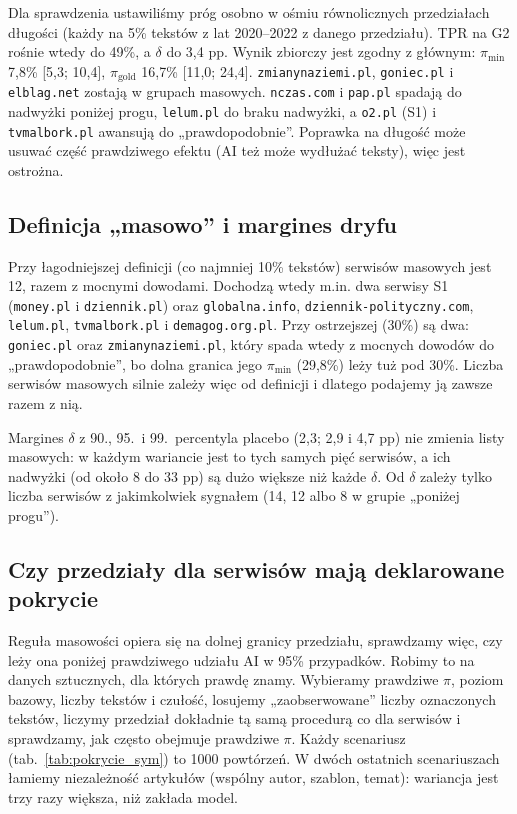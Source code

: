 \documentclass[11pt,a4paper]{article}
\newcommand{\pimin}{\ensuremath{\pi_{\mathrm{min}}}}
\newcommand{\pigold}{\ensuremath{\pi_{\mathrm{gold}}}}
\newcommand{\dom}[1]{\texttt{#1}}
\begin{document}
Dla sprawdzenia ustawiliśmy próg osobno w ośmiu równolicznych przedziałach długości (każdy na 5\% tekstów z lat 2020--2022 z danego przedziału). TPR na G2 rośnie wtedy do 49\%, a $\delta$ do 3,4 pp. Wynik zbiorczy jest zgodny z głównym: \pimin{} 7,8\% [5,3; 10,4], \pigold{} 16,7\% [11,0; 24,4]. \dom{zmianynaziemi.pl}, \dom{goniec.pl} i \dom{elblag.net} zostają w grupach masowych. \dom{nczas.com} i \dom{pap.pl} spadają do nadwyżki poniżej progu, \dom{lelum.pl} do braku nadwyżki, a \dom{o2.pl} (S1) i \dom{tvmalbork.pl} awansują do „prawdopodobnie”. Poprawka na długość może usuwać część prawdziwego efektu (AI też może wydłużać teksty), więc jest ostrożna.

\subsection{Definicja „masowo” i margines dryfu}

Przy łagodniejszej definicji (co najmniej 10\% tekstów) serwisów masowych jest 12, razem z mocnymi dowodami. Dochodzą wtedy m.in. dwa serwisy S1 (\dom{money.pl} i \dom{dziennik.pl}) oraz \dom{globalna.info}, \dom{dziennik-polityczny.com}, \dom{lelum.pl}, \dom{tvmalbork.pl} i \dom{demagog.org.pl}. Przy ostrzejszej (30\%) są dwa: \dom{goniec.pl} oraz \dom{zmianynaziemi.pl}, który spada wtedy z mocnych dowodów do „prawdopodobnie”, bo dolna granica jego \pimin{} (29,8\%) leży tuż pod 30\%. Liczba serwisów masowych silnie zależy więc od definicji i dlatego podajemy ją zawsze razem z nią.

Margines $\delta$ z 90., 95.\ i 99.\ percentyla placebo (2,3; 2,9 i 4,7 pp) nie zmienia listy masowych: w każdym wariancie jest to tych samych pięć serwisów, a ich nadwyżki (od około 8 do 33 pp) są dużo większe niż każde $\delta$. Od $\delta$ zależy tylko liczba serwisów z jakimkolwiek sygnałem (14, 12 albo 8 w grupie „poniżej progu”).

\subsection{Czy przedziały dla serwisów mają deklarowane pokrycie}\label{sec:pokrycie}

Reguła masowości opiera się na dolnej granicy przedziału, sprawdzamy więc, czy leży ona poniżej prawdziwego udziału AI w 95\% przypadków. Robimy to na danych sztucznych, dla których prawdę znamy. Wybieramy prawdziwe $\pi$, poziom bazowy, liczby tekstów i czułość, losujemy „zaobserwowane” liczby oznaczonych tekstów, liczymy przedział dokładnie tą samą procedurą co dla serwisów i sprawdzamy, jak często obejmuje prawdziwe $\pi$. Każdy scenariusz (tab.~\ref{tab:pokrycie_sym}) to 1000 powtórzeń. W dwóch ostatnich scenariuszach łamiemy niezależność artykułów (wspólny autor, szablon, temat): wariancja jest trzy razy większa, niż zakłada model.
\end{document}
